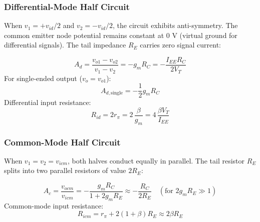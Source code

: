 \documentclass[12pt,a4paper]{article}
\begin{document}
\subsubsection{Differential-Mode Half Circuit}
When $v_1 = +v_{id}/2$ and $v_2 = -v_{id}/2$, the circuit exhibits anti-symmetry. The common emitter node potential remains constant at $0\text{ V}$ (virtual ground for differential signals). The tail impedance $R_E$ carries zero signal current:
\begin{tcolorbox}[formulabox, title={Differential Gain ($A_d$) \& Input Impedance ($R_{id}$)}]
\begin{equation}
  A_d = \frac{v_{o1} - v_{o2}}{v_1 - v_2} = -g_m R_C = -\frac{I_{EE} R_C}{2 V_T}
\end{equation}
For single-ended output ($v_o = v_{o1}$):
\begin{equation}
  A_{d,\text{single}} = -\frac{1}{2} g_m R_C
\end{equation}
Differential input resistance:
\begin{equation}
  R_{id} = 2 r_\pi = 2\,\frac{\beta}{g_m} = 4\,\frac{\beta V_T}{I_{EE}}
\end{equation}
\end{tcolorbox}

\subsubsection{Common-Mode Half Circuit}
When $v_1 = v_2 = v_{icm}$, both halves conduct equally in parallel. The tail resistor $R_E$ splits into two parallel resistors of value $2R_E$:
\begin{tcolorbox}[formulabox, title={Common-Mode Gain ($A_c$) \& Input Impedance ($R_{icm}$)}]
\begin{equation}
  A_c = \frac{v_{ocm}}{v_{icm}} = -\frac{g_m R_C}{1 + 2 g_m R_E} \approx -\frac{R_C}{2 R_E} \quad (\text{for } 2g_m R_E \gg 1)
\end{equation}
Common-mode input resistance:
\begin{equation}
  R_{icm} = r_\pi + 2(1+\beta)R_E \approx 2\beta R_E
\end{equation}
\end{tcolorbox}
\end{document}
